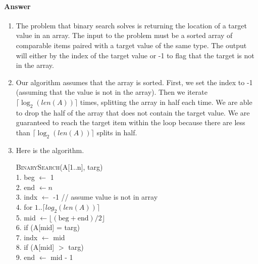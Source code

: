 \documentclass{article}
\begin{document}
\paragraph{Answer}


\begin{enumerate}
    \item The problem that binary search solves is returning the location of a target value in an array.
    The input to the problem must be a sorted array of comparable items paired with a target value of the same type.
    The output will either by the index of the target value or -1 to flag that the target is not in the array.
    \item Our algorithm assumes that the array is sorted.
    First, we set the index to -1 (assuming that the value is not in the array).
    Then we iterate $\lceil \log_2(len(A)) \rceil$ times, splitting the array in half each time.
    We are able to drop the half of the array that does not contain the target value.
    We are guaranteed to reach the target item within the loop because there are less than $\lceil \log_2 (len(A)) \rceil$ splits in half.
    \item Here is the algorithm.
    \begin{algorithm}
    	\textsc{BinarySearch}(A[1..n], targ) \\
    	1.  \hspace{0em}   beg $\leftarrow$ 1 \\
    	2.  \hspace{0em}   end $\leftarrow n$ \\
        3.  \hspace{0em}   indx $\leftarrow$ -1 // assume value is not in array \\
    	4.  \hspace{0em}   for $1.. \lceil log_2(len(A)) \rceil$ \\
    	5.  \hspace{2em}       mid $\leftarrow \lfloor (\text{beg}+\text{end})/2 \rfloor$ \\
    	6.  \hspace{2em}	   if (A[mid] = targ) \\
    	7.  \hspace{4em}	       indx $\leftarrow$ mid \\
    	8.  \hspace{2em}	   if (A[mid] $>$ targ) \\
    	9.  \hspace{4em}		   end $\leftarrow$ mid - 1 \\

\end{algorithm}
\end{enumerate}
\end{document}
